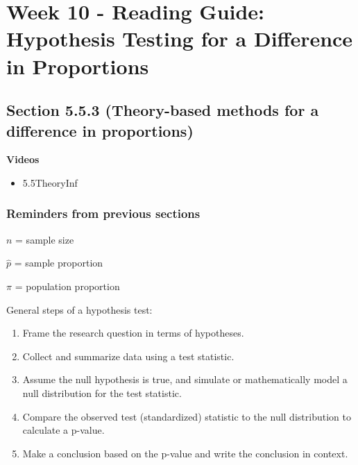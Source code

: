 \documentclass[
]{report}
\providecommand{\tightlist}{%
  \setlength{\itemsep}{0pt}\setlength{\parskip}{0pt}}
\begin{document}
\hypertarget{week-10---reading-guide-hypothesis-testing-for-a-difference-in-proportions}{%
\section{Week 10 - Reading Guide: Hypothesis Testing for a Difference in Proportions}\label{week-10---reading-guide-hypothesis-testing-for-a-difference-in-proportions}}

\hypertarget{section-5.5.3-theory-based-methods-for-a-difference-in-proportions}{%
\subsection*{Section 5.5.3 (Theory-based methods for a difference in proportions)}\label{section-5.5.3-theory-based-methods-for-a-difference-in-proportions}}


\textbf{Videos}

\begin{itemize}
\tightlist
\item
  5.5TheoryInf
\end{itemize}


\hypertarget{reminders-from-previous-sections-4}{%
\subsubsection*{Reminders from previous sections}\label{reminders-from-previous-sections-4}}

\(n\) = sample size

\(\hat{p}\) = sample proportion

\(\pi\) = population proportion

General steps of a hypothesis test:

\begin{enumerate}
\def\labelenumi{\arabic{enumi}.}
\item
  Frame the research question in terms of hypotheses.
\item
  Collect and summarize data using a test statistic.
\item
  Assume the null hypothesis is true, and simulate or mathematically model a null distribution for the test statistic.
\item
  Compare the observed test (standardized) statistic to the null distribution to calculate a p-value.
\item
  Make a conclusion based on the p-value and write the conclusion in context.
\end{enumerate}
\end{document}
